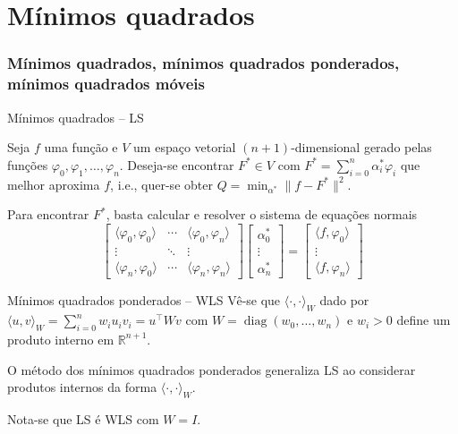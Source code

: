 \documentclass[../main/main.tex]{subfiles}
\begin{document}
\section{Mínimos quadrados}

\begin{frame}
	\frametitle{Mínimos quadrados, mínimos quadrados ponderados, mínimos quadrados móveis}
\end{frame}

\begin{frame}{Mínimos quadrados -- LS}

	Seja $f$ uma função e $V$ um espaço vetorial $(n+1)$-dimensional gerado pelas funções $\varphi_0,\varphi_1,\dotsc,\varphi_n$. Deseja-se encontrar $F^*\in V$ com $F^* = \sum_{i=0}^n \alpha_i^*\varphi_i$ que melhor aproxima $f$, i.e., quer-se obter $Q = \min_{\alpha^*}\lVert f - F^*\rVert^2$.
\end{frame}

\begin{frame}
	Para encontrar $F^*$, basta calcular e resolver o sistema de equações normais\[
		\begin{bmatrix}
			\langle\varphi_0,\varphi_0\rangle & \cdots & \langle\varphi_0,\varphi_n\rangle \\
			\vdots                            & \ddots & \vdots                            \\
			\langle\varphi_n,\varphi_0\rangle & \cdots & \langle\varphi_n,\varphi_n\rangle
		\end{bmatrix}\begin{bmatrix}
			\alpha_0^* \\
			\vdots     \\
			\alpha_n^*
		\end{bmatrix} = \begin{bmatrix}
			\langle f,\varphi_0\rangle \\
			\vdots                     \\
			\langle f,\varphi_n\rangle
		\end{bmatrix}
	\]
\end{frame}

\begin{frame}{Mínimos quadrados ponderados -- WLS}
	Vê-se que ${\langle\cdot,\cdot\rangle}_W$ dado por ${\langle u,v\rangle}_W = \sum_{i=0}^n w_i u_i v_i = u^\intercal W v$ com $W = \operatorname{diag}(w_0,\dotsc,w_n)$ e $w_i > 0$ define um produto interno em $\mathbb{R}^{n+1}$.\pause

	O método dos mínimos quadrados ponderados generaliza LS ao considerar produtos internos da forma ${\langle\cdot,\cdot\rangle}_W$.\pause

	Nota-se que LS é WLS com $W = I$.
\end{frame}
\end{document}
